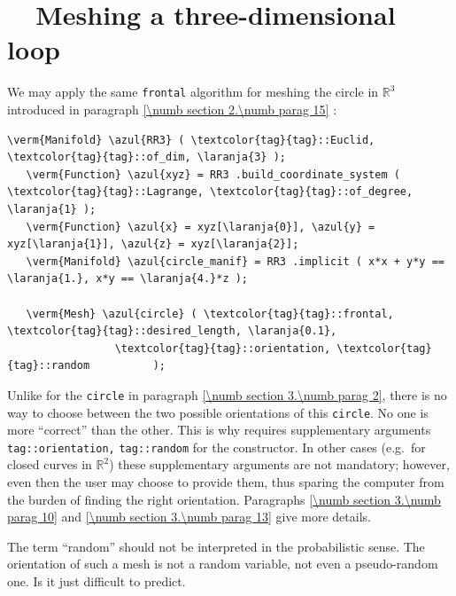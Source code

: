 \section{~~Meshing a three-dimensional loop}\label{\numb section 3.\numb parag 4}

We may apply the same {\small\tt frontal} algorithm for meshing the circle in
$ \mathbb{R}^3 $ introduced in paragraph \ref{\numb section 2.\numb parag 15} :

\begin{Verbatim}[commandchars=\\\{\},formatcom=\small\tt,frame=single,
   label=parag-\ref{\numb section 3.\numb parag 4}.cpp,rulecolor=\color{moldura},
   baselinestretch=0.94,framesep=2mm                                            ]
   \verm{Manifold} \azul{RR3} ( \textcolor{tag}{tag}::Euclid, \textcolor{tag}{tag}::of_dim, \laranja{3} );
   \verm{Function} \azul{xyz} = RR3 .build_coordinate_system ( \textcolor{tag}{tag}::Lagrange, \textcolor{tag}{tag}::of_degree, \laranja{1} );
   \verm{Function} \azul{x} = xyz[\laranja{0}], \azul{y} = xyz[\laranja{1}], \azul{z} = xyz[\laranja{2}];
   \verm{Manifold} \azul{circle_manif} = RR3 .implicit ( x*x + y*y == \laranja{1.}, x*y == \laranja{4.}*z );
   
   \verm{Mesh} \azul{circle} ( \textcolor{tag}{tag}::frontal, \textcolor{tag}{tag}::desired_length, \laranja{0.1},
                 \textcolor{tag}{tag}::orientation, \textcolor{tag}{tag}::random          );
\end{Verbatim}

Unlike for the {\small\tt circle} in paragraph \ref{\numb section 3.\numb parag 2},
there is no way to choose between the two possible orientations of this {\small\tt circle}.
No one is more ``correct'' than the other.
This is why {\maniFEM} requires supplementary arguments
{\small\tt\textcolor{tag}{tag}::orientation,} {\small\tt\textcolor{tag}{tag}::random}
for the {\small\tt{}} constructor.
In other cases (e.g.\ for closed curves in $ \mathbb{R}^2 $) these supplementary arguments
are not mandatory; however, even then the user may choose to provide them,
thus sparing the computer from the burden of finding the right orientation.
Paragraphs \ref{\numb section 3.\numb parag 10} and \ref{\numb section 3.\numb parag 13}
give more details.

The term ``random'' should not be interpreted in the probabilistic sense.
The orientation of such a mesh is not a random variable, not even a pseudo-random one.
Is it just difficult to predict.

